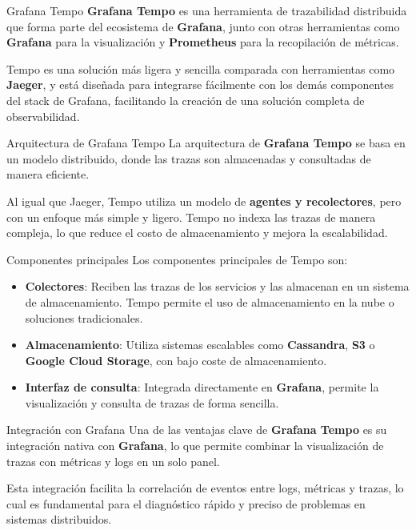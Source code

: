 \documentclass{beamer}
\begin{document}

\begin{frame}{Grafana Tempo}
\textbf{Grafana Tempo} es una herramienta de trazabilidad distribuida que forma parte del ecosistema de \textbf{Grafana}, junto con otras herramientas como \textbf{Grafana} para la visualización y \textbf{Prometheus} para la recopilación de métricas.

Tempo es una solución más ligera y sencilla comparada con herramientas como \textbf{Jaeger}, y está diseñada para integrarse fácilmente con los demás componentes del stack de Grafana, facilitando la creación de una solución completa de observabilidad.
\end{frame}

\begin{frame}{Arquitectura de Grafana Tempo}
La arquitectura de \textbf{Grafana Tempo} se basa en un modelo distribuido, donde las trazas son almacenadas y consultadas de manera eficiente.

Al igual que Jaeger, Tempo utiliza un modelo de \textbf{agentes y recolectores}, pero con un enfoque más simple y ligero. Tempo no indexa las trazas de manera compleja, lo que reduce el costo de almacenamiento y mejora la escalabilidad.
\end{frame}

\begin{frame}{Componentes principales}
Los componentes principales de Tempo son:
\begin{itemize}
  \item \textbf{Colectores}: Reciben las trazas de los servicios y las almacenan en un sistema de almacenamiento. Tempo permite el uso de almacenamiento en la nube o soluciones tradicionales.
  \item \textbf{Almacenamiento}: Utiliza sistemas escalables como \textbf{Cassandra}, \textbf{S3} o \textbf{Google Cloud Storage}, con bajo coste de almacenamiento.
  \item \textbf{Interfaz de consulta}: Integrada directamente en \textbf{Grafana}, permite la visualización y consulta de trazas de forma sencilla.
\end{itemize}
\end{frame}

\begin{frame}{Integración con Grafana}
Una de las ventajas clave de \textbf{Grafana Tempo} es su integración nativa con \textbf{Grafana}, lo que permite combinar la visualización de trazas con métricas y logs en un solo panel.

Esta integración facilita la correlación de eventos entre logs, métricas y trazas, lo cual es fundamental para el diagnóstico rápido y preciso de problemas en sistemas distribuidos.
\end{frame}
\end{document}
